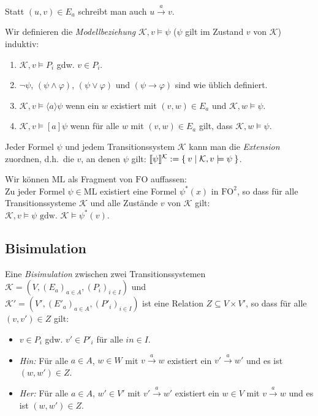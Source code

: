 \documentclass[a4paper,parskip=half*,DIV=15,fontsize=11pt]{scrartcl}
\DeclarePairedDelimiter\interpret{\llbracket}{\rrbracket}
\newcommand{\FO}{\mathrm{FO}}
\newcommand{\K}{\mathcal{K}}
\newcommand{\ML}{\mathrm{ML}}
\begin{document}
Statt $(u,v) \in E_a$ schreibt man auch $u \overset{a}{\to} v$.

Wir definieren die \emph{Modellbeziehung} $\K,v \models \psi$ ($\psi$ gilt im Zustand $v$ von $\K$) induktiv:
\begin{enumerate}
\item $\K,v \models P_i$ gdw. $v \in P_i$.
\item $\neg \psi$, $(\psi \land \varphi)$, $(\psi \lor \varphi)$ und $(\psi \to \varphi)$ sind wie üblich definiert.
\item $\K,v \models \langle a \rangle \psi $ wenn ein $w$ existiert mit $(v,w) \in E_a$ und $\K,w \models \psi $.
\item $\K,v \models [a] \psi $ wenn für alle $w$ mit $(v,w) \in E_a$ gilt, dass $\K,w \models \psi $.
\end{enumerate}

Jeder Formel $\psi$ und jedem Transitionssystem $\K$ kann man die \emph{Extension} zuordnen, d.h.\ die $v$, an denen $\psi$ gilt: $\interpret{\psi}^\K := \Set{v | \K, v \models \psi}$.

Wir können $\ML$ als Fragment von $\FO$ auffassen: \\
Zu jeder Formel $\psi \in \ML$ existiert eine Formel $\psi^\ast(x)$ in $\FO^2$, so dass für alle Transitionssysteme $\K$ und alle Zustände $v$ von $\K$ gilt:
$\K,v \models \psi \text{ gdw.\ }\K \models \psi^\ast(v)$.

\subsection{Bisimulation}

Eine \emph{Bisimulation} zwischen zwei Transitionssystemen $\K = (V, (E_a)_{a \in A}, (P_i)_{i \in I})$ und\\ $\K' = (V', (E'_a)_{a \in A}, (P'_i)_{i \in I})$ ist eine Relation $Z \subseteq V \times  V'$, so dass für alle $(v, v') \in Z$ gilt:

\begin{itemize}
  \item $v \in P_i$ gdw. $v' \in P'_i$ für alle $in \in I$.
  \item \emph{Hin:} Für alle $a \in A$, $w \in W$ mit $v \overset{a}{\to} w$ existiert ein $v' \overset{a}{\to} w'$ und es ist $(w, w') \in Z$.
  \item \emph{Her:} Für alle $a \in A$, $w' \in V'$ mit $v' \overset{a}{\to} w'$ existiert ein $w \in V$ mit $v \overset{a}{\to} w$ und es ist $(w, w') \in Z$.
\end{itemize}
\end{document}
